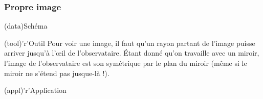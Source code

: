 \documentclass[../../main/main.tex]{subfiles}
\begin{document}
\subsubsection{Propre image}
\begin{tcbraster}[raster columns=2, raster equal height=rows]
	\begin{tcb}(data){Schéma}
		\begin{center}
		\end{center}
	\end{tcb}
	\begin{tcolorbox}[blankest, raster multicolumn=1, space to=\myspace]
		\begin{tcbraster}[raster columns=1]
			\begin{tcb}(tool)'r'{Outil}
				Pour voir une image, il faut qu'un rayon partant de l'image
				puisse arriver jusqu'à l'œil de l'observataire. Étant donné
				qu'on travaille avec un miroir, l'image de l'observataire est
				son symétrique par le plan du miroir (même si le miroir ne
				s'étend pas jusque-là !).
			\end{tcb}
			\begin{tcb}(appl)'r'{Application}
			\end{tcb}
		\end{tcbraster}
	\end{tcolorbox}
\end{tcbraster}
\end{document}
